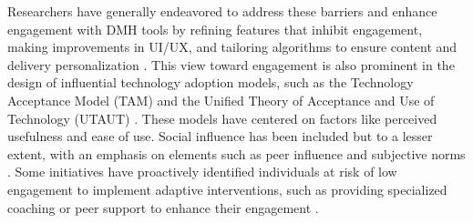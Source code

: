 

Researchers have generally endeavored to address these barriers and enhance engagement with DMH tools by refining features that inhibit engagement, making improvements in UI/UX, and tailoring algorithms to ensure content and delivery personalization  \cite{doherty2012engagement, harding2015hci, poole2013hci, xu2013designing, howe2022design, lipschitz2023engagement, yardley2016understanding}. This view toward engagement is also prominent in the design of influential technology adoption models, such as the Technology Acceptance Model (TAM) \cite{venkatesh2008technology, davis1989perceived} and the Unified Theory of Acceptance and Use of Technology (UTAUT) \cite{venkatesh2003user, dwivedi2019re}. %
These models have centered on factors like perceived usefulness and ease of use. 
Social influence has been included but to a lesser extent, with an emphasis on elements such as peer influence and subjective norms \cite{marangunic2015technology}. Some initiatives have proactively identified individuals at risk of low engagement to implement adaptive interventions, such as providing specialized coaching or peer support to enhance their engagement \cite{arnold2019predicting, lipschitz2023engagement, jung2023enjoy}. %

